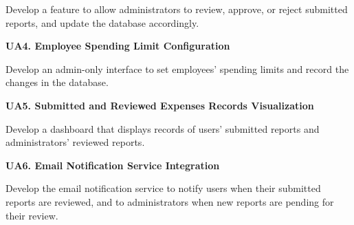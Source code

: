 Develop a feature to allow administrators to review, approve, or reject submitted reports, and update the database accordingly.

\textbf{UA4. Employee Spending Limit Configuration}

Develop an admin-only interface to set employees' spending limits and record the changes in the database.

\textbf{UA5. Submitted  and Reviewed Expenses Records Visualization}

Develop a dashboard that displays records of users' submitted reports and administrators' reviewed reports.

\textbf{UA6. Email Notification Service Integration}

Develop the email notification service to notify users when their submitted reports are reviewed, and to administrators when new reports are pending for their review. 